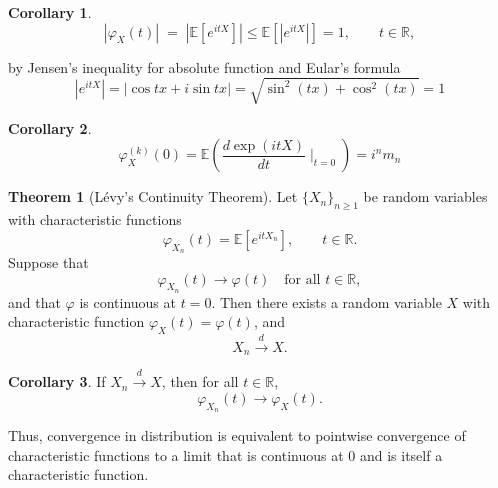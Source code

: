 \documentclass[11pt]{article}
\theoremstyle{definition}
\newtheorem{theo}{Theorem}[section]
\newtheorem{corollary}{Corollary}[section]
\begin{document}
\begin{corollary}
    \[
|\varphi_X(t)| \;=\; |\mathbb{E}\!\left[e^{itX}\right]| \leq \mathbb{E}\!\left[|e^{itX}|\right]=1, \qquad t \in \mathbb{R},
\]
\end{corollary}
by Jensen's inequality for absolute function and Eular's formula
$$
|e^{itX}|=|\cos tx + i \sin tx| = \sqrt{\sin^2(tx) + \cos^2(tx)}=1
$$
\begin{corollary}
    \[
    \varphi^{(k)}_X(0) = \mathbb{E}(\frac{d\exp(itX)}{dt}\mid_{t=0}) = i^nm_n
    \]
\end{corollary}
\begin{theo}[Lévy's Continuity Theorem]
Let $\{X_n\}_{n\ge 1}$ be random variables with characteristic functions
\[
\varphi_{X_n}(t) = \mathbb{E}\!\left[e^{itX_n}\right], \qquad t \in \mathbb{R}.
\]
Suppose that
\[
\varphi_{X_n}(t) \longrightarrow \varphi(t) \quad \text{for all } t \in \mathbb{R},
\]
and that $\varphi$ is continuous at $t=0$.  
Then there exists a random variable $X$ with characteristic function $\varphi_X(t)=\varphi(t)$, and
\[
X_n \xrightarrow{d} X.
\]
\end{theo}

\begin{corollary}
If $X_n \xrightarrow{d} X$, then for all $t \in \mathbb{R}$,
\[
\varphi_{X_n}(t) \longrightarrow \varphi_X(t).
\]
\end{corollary}
Thus, convergence in distribution is equivalent to pointwise convergence of characteristic functions to a limit that is continuous at $0$ and is itself a characteristic function.
\end{document}

